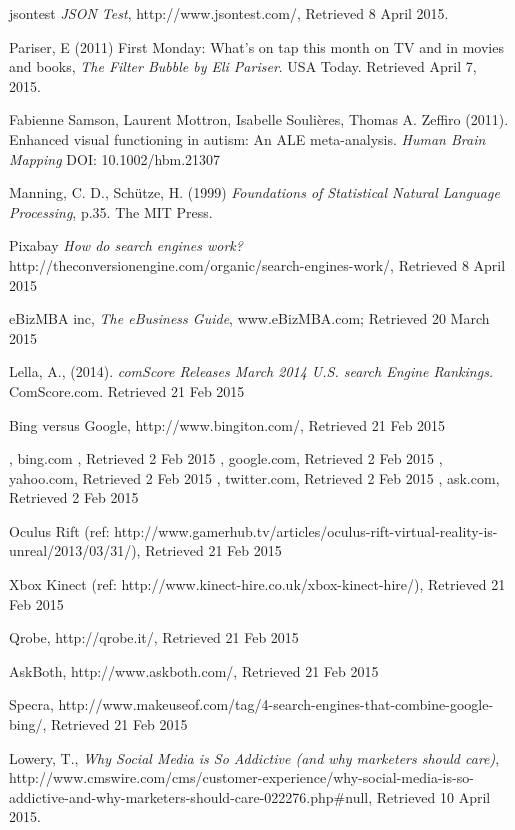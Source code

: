 \documentclass[a4paper, 11pt]{article}
\begin{document}
\begin{thebibliography}{100}
jsontest \textit{JSON Test}, http://www.jsontest.com/, Retrieved 8 April 2015.

 Pariser, E (2011) First Monday: What's on tap this month on TV and in movies and books, \textit{The Filter Bubble by Eli Pariser}. USA Today. Retrieved April 7, 2015. 

Fabienne Samson, Laurent Mottron, Isabelle Soulières, Thomas A. Zeffiro (2011). Enhanced visual functioning in autism: An ALE meta-analysis. \textit{Human Brain Mapping} DOI: 10.1002/hbm.21307

Manning, C. D., Schütze, H. (1999) \textit{Foundations of Statistical Natural Language Processing}, p.35. The MIT Press.

 Pixabay \textit{How do search engines work?} http://theconversionengine.com/organic/search-engines-work/, Retrieved 8 April 2015

eBizMBA inc, \textit{The eBusiness Guide}, www.eBizMBA.com; Retrieved 20 March 2015

Lella, A., (2014). \textit{comScore Releases March 2014 U.S. search Engine Rankings.} ComScore.com. Retrieved 21 Feb 2015

 Bing versus Google, http://www.bingiton.com/, Retrieved 21 Feb 2015 

 , bing.com , Retrieved 2 Feb 2015 
 , google.com, Retrieved 2 Feb 2015 
 , yahoo.com, Retrieved 2 Feb 2015 
, twitter.com, Retrieved 2 Feb 2015 
, ask.com, Retrieved 2 Feb 2015 

 Oculus Rift (ref: http://www.gamerhub.tv/articles/oculus-rift-virtual-reality-is-unreal/2013/03/31/), Retrieved 21 Feb 2015 

 Xbox Kinect (ref: http://www.kinect-hire.co.uk/xbox-kinect-hire/), Retrieved 21 Feb 2015

 Qrobe, http://qrobe.it/, Retrieved 21 Feb 2015 

 AskBoth, http://www.askboth.com/, Retrieved 21 Feb 2015 

 Specra, http://www.makeuseof.com/tag/4-search-engines-that-combine-google-bing/, Retrieved 21 Feb 2015 

 Lowery, T., \textit{Why Social Media is So Addictive (and why marketers should care)}, http://www.cmswire.com/cms/customer-experience/why-social-media-is-so-addictive-and-why-marketers-should-care-022276.php\#null, Retrieved 10 April 2015.


\end{thebibliography}
\end{document}
